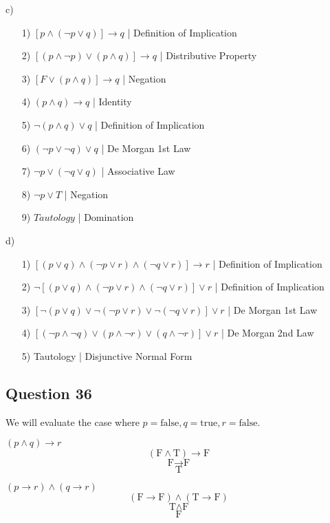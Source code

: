 \documentclass{article}
\begin{document}
c)  \begin{enumerate}
    \item[1)] \( [p \land (\neg p \lor q)] \to q \) \hfill | Definition of Implication
    \item[2)] \( [(p \land \neg p) \lor (p \land q)] \to q\) \hfill | Distributive Property
    \item[3)] \( [F \lor (p \land q)] \to q\) \hfill | Negation
    \item[4)] \((p \land q) \to q\) \hfill | Identity
    \item[5)] \( \neg (p \land q) \lor q\) \hfill | Definition of Implication
    \item[6)] \( (\neg p \lor \neg q) \lor q\) \hfill | De Morgan 1st Law
    \item[7)] \( \neg p \lor (\neg q \lor q) \) \hfill | Associative Law
    \item[8)] \( \neg p \lor T \) \hfill | Negation
    \item[9)] \( Tautology \) \hfill | Domination
\end{enumerate}

d) \begin{enumerate}
    \item[1)] \(  [(p \lor q) \land (\neg p \lor r) \land (\neg q \lor r)] \to r\) \hfill | Definition of Implication
    \item[2)] \( \neg [(p \lor q) \land (\neg p \lor r) \land (\neg q \lor r)] \lor r \) \hfill | Definition of Implication
    \item[3)] \( [\neg (p \lor q) \lor \neg (\neg p \lor r) \lor \neg (\neg q \lor r)] \lor r \) \hfill | De Morgan 1st Law
    \item[4)] \( [(\neg p \land \neg q) \lor (p \land \neg r) \lor (q \land \neg r)] \lor r \) \hfill | De Morgan 2nd Law
    \item[5)] Tautology \hfill | Disjunctive Normal Form

\end{enumerate}

\subsection*{Question 36}

\noindent
We will evaluate the case where \( p = \text{false}, q = \text{true}, r = \text{false} \).

\noindent
\begin{minipage}{0.45\textwidth}
\raggedright
\( (p \land q) \to r \)
\[
(\text{F} \land \text{T}) \to \text{F}
\]
\[
\text{F} \to \text{F}
\]
\[
\text{T}
\]
\end{minipage}
\hfill
\begin{minipage}{0.45\textwidth}
\raggedright
\( (p \to r) \land (q \to r) \)
\[
(\text{F} \to \text{F})  \land (\text{T} \to \text{F}) 
\]
\[
\text{T} \land \text{F}
\]
\[
\text{F}
\]
\end{minipage}
\end{document}
